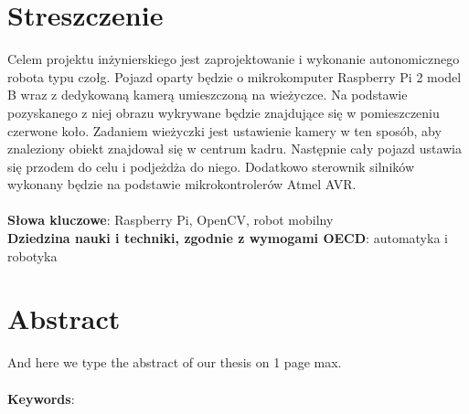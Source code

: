 
\chapter*{Streszczenie}
Celem projektu inżynierskiego jest zaprojektowanie i wykonanie autonomicznego robota typu czołg. Pojazd oparty będzie o mikrokomputer Raspberry Pi 2 model B wraz z dedykowaną kamerą umieszczoną na wieżyczce. Na podstawie pozyskanego z niej obrazu wykrywane będzie znajdujące się w  pomieszczeniu czerwone koło. Zadaniem wieżyczki jest ustawienie kamery w ten sposób, aby znaleziony obiekt znajdował się w centrum kadru. Następnie cały pojazd ustawia się przodem do celu i podjeżdża do niego. Dodatkowo sterownik silników wykonany będzie na podstawie mikrokontrolerów Atmel AVR.
\\\\
\noindent
\textbf{Słowa kluczowe}: Raspberry Pi, OpenCV, robot mobilny
\\

\noindent
\textbf{Dziedzina nauki i techniki, zgodnie z wymogami OECD}: automatyka i robotyka
\chapter*{Abstract}
And here we type the abstract of our thesis on 1 page max.
\\\\
\noindent
\textbf{Keywords}: